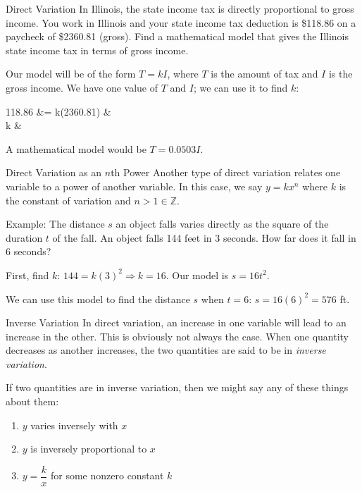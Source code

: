 \documentclass[t]{beamer}
\def\Z{\mathbb{Z}} %
\begin{document}
	\begin{frame}{Direct Variation}
		In Illinois, the state income tax is directly proportional to gross income. You work in Illinois and your state income tax deduction is \$118.86 on a paycheck of \$2360.81 (gross). Find a mathematical model that gives the Illinois state income tax in terms of gross income. \pause
		
		Our model will be of the form $T = kI$, where $T$ is the amount of tax and $I$ is the gross income. We have one value of $T$ and $I$; we can use it to find $k$: \begin{flalign*}
		118.86 &= k(2360.81) & \\
		k &
		\end{flalign*} \pause
		A mathematical model would be $T = 0.0503I$.
	\end{frame}

	\begin{frame}{Direct Variation as an $n$th Power}
		Another type of direct variation relates one variable to a power of another variable. In this case, we say $y = kx^n$ where $k$ is the constant of variation and $n > 1 \in \Z$. \pause
		
		 Example: The distance $s$ an object falls varies directly as the square of the duration $t$ of the fall. An object falls 144 feet in 3 seconds. How far does it fall in 6 seconds? \pause
		 
		 First, find $k$: $144 = k(3)^2 \Rightarrow k = 16$. Our model is $s = 16t^2$. \pause
		 
		 We can use this model to find the distance $s$ when $t = 6$: $s = 16(6)^2 = 576$ ft.
	\end{frame}
	
	\begin{frame}{Inverse Variation}
		In direct variation, an increase in one variable will lead to an increase in the other. This is obviously not always the case. When one quantity decreases as another increases, the two quantities are said to be in \textit{inverse variation}. \pause
		
		If two quantities are in inverse variation, then we might say any of these things about them: \begin{enumerate}[1)]
			\item $y$ varies inversely with $x$
			\item $y$ is inversely proportional to $x$
			\item $y = \dfrac{k}{x}$ for some nonzero constant $k$
		\end{enumerate}
	\end{frame}
\end{document}
